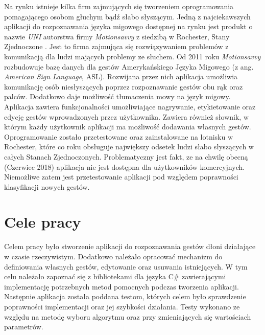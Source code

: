 Na rynku istnieje kilka firm zajmujących się tworzeniem oprogramowania pomagającego osobom głuchym bądź słabo słyszącym. Jedną z najciekawszych aplikacji do rozpoznawania języka migowego dostępnej na rynku jest produkt o nazwie \textit{UNI} autorstwa firmy \textit{Motionsavvy} z siedzibą w Rochester, Stany Zjednoczone . Jest to firma zajmująca się rozwiązywaniem problemów z komunikacją dla ludzi mających problemy ze słuchem. Od 2011 roku \textit{Motionsavvy} rozbudowuje bazę danych dla gestów Amerykańskiego Języka Migowego (z ang. \textit{American Sign Language}, ASL). Rozwijana przez nich aplikacja umożliwia komunikację osób niesłyszących poprzez rozpoznawanie gestów obu rąk oraz palców. Dodatkowo daje możliwość tłumaczenia mowy na język migowy. Aplikacja zawiera funkcjonalności umożliwiające nagrywanie, etykietowanie oraz edycję gestów wprowadzonych przez użytkownika. Zawiera również słownik, w którym każdy użytkownik aplikacji ma możliwość dodawania własnych gestów. Oprogramowanie zostało przetestowane oraz zainstalowane na lotnisku w Rochester, które co roku obsługuje największy odsetek ludzi słabo słyszących w całych Stanach Zjednoczonych. Problematyczny jest fakt, ze na chwilę obecną (Czerwiec 2018) aplikacja nie jest dostępna dla użytkowników komercyjnych. Niemożliwe zatem jest przetestowanie aplikacji pod względem poprawności klasyfikacji nowych gestów.
 


\section{Cele pracy}
\label{sec:celePracy}
Celem pracy było stworzenie aplikacji do rozpoznawania gestów dłoni działające w czasie rzeczywistym. Dodatkowo należało opracować mechanizm do definiowania własnych gestów, edytowanie oraz usuwania istniejących. W tym celu należało zapoznać się z bibliotekami dla języka C\# zawierającymi implementację potrzebnych metod pomocnych podczas tworzenia aplikacji. Następnie aplikacja została poddana testom, których celem było sprawdzenie poprawności implementacji oraz jej szybkości działania. Testy wykonano ze względu na metodę wyboru algorytmu oraz przy zmieniających się wartościach parametrów.

